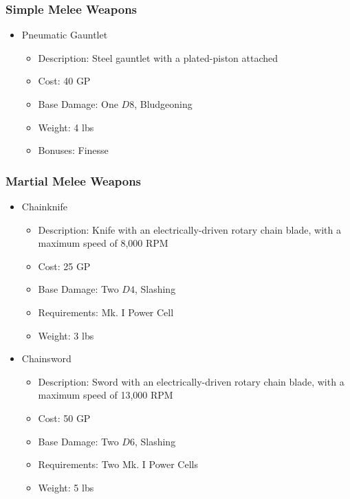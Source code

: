 \documentclass[12pt, landscape]{article}
\begin{document}
\begin{FlushLeft}
\begin{multicols}{2}
			\subsubsection{Simple Melee Weapons}
			\begin{itemize}
				\item Pneumatic Gauntlet
				\begin{itemize}
					\item Description: Steel gauntlet with a plated-piston attached
					\item Cost: 40 GP
					\item Base Damage: One $D8$, Bludgeoning
					\item Weight: 4 lbs
					\item Bonuses: Finesse
				\end{itemize}
			\end{itemize}

			\subsubsection{Martial Melee Weapons}
			\begin{itemize}
				\item Chainknife
				\begin{itemize}
					\item Description: Knife with an electrically-driven rotary chain blade, with a maximum speed of 8,000 RPM
					\item Cost: 25 GP
					\item Base Damage: Two $D4$, Slashing
					\item Requirements: Mk. I Power Cell
					\item Weight: 3 lbs
				\end{itemize}
			\end{itemize}

			\begin{itemize}
				\item Chainsword
				\begin{itemize}
					\item Description: Sword with an electrically-driven rotary chain blade, with a maximum speed of 13,000 RPM
					\item Cost: 50 GP
					\item Base Damage: Two $D6$, Slashing
					\item Requirements: Two Mk. I Power Cells
					\item Weight: 5 lbs
				\end{itemize}
			\end{itemize}
			\vfill


\end{multicols}
\end{FlushLeft}
\end{document}
